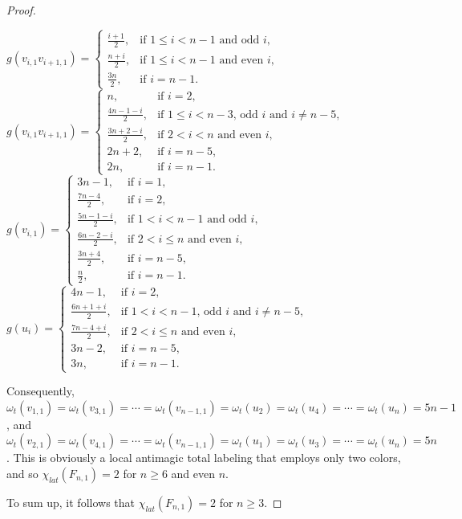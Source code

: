 \documentclass[12pt]{article}
\begin{document}
\begin{proof}
\begin{center}
$g(v_{i,1}v_{i+1,1})=\begin{cases}
\frac{i+1}{2}, & \text{if $1\leq i<n-1$ and odd $i$},\\[4pt]
 \frac{n+i}{2}, & \text{if $1\leq i<n-1$ and even $i$},\hspace{6em}\\[4pt]
\frac{3n}{2}, &\text{if $i=n-1$}. \end{cases}$\\[6pt]
$g(v_{i,1}v_{i+1,1})=\begin{cases}
n,    & \text{if } i=2,\\[8pt]
\frac{4n-1-i}{2}, & \text{if  $1\leq i<n-3$, odd $i$ and $i\neq n-5$},\\[4pt]
\frac{3n+2-i}{2}, & \text{if $2< i<n$ and even $i$},\\[4pt]
2n+2, & \text{if } i=n-5,\\[4pt]
2n, &\text{if $i=n-1$}. \end{cases}$\\[8pt]
$g(v_{i,1})=\begin{cases}
	3n-1, & \text{if } i=1,\\[4pt]
\frac{7n-4}{2}, & \text{if } i=2,\\[4pt]
	\frac{5n-1-i}{2}, & \text{if $1< i< n-1$ and odd $i$},\hspace{5em}\\[4pt]
	\frac{6n-2-i}{2}, & \text{if $2< i\leq n$ and even $i$},\\[4pt]
	\frac{3n+4}{2}, & \text{if } i=n-5,\\[4pt]
	\frac{n}{2}, &\text{if $i=n-1$}. \end{cases}$\\[8pt]
$g(u_{i})=\begin{cases}
		4n-1, & \text{if } i=2,\\[4pt]
		\frac{6n+1+i}{2}, & \text{if $1<i< n-1$, odd $i$ and $i\neq n-5$},\\[4pt]
		\frac{7n-4+i}{2}, & \text{if $2< i\leq n$ and even $i$},\\[4pt]
		3n-2, & \text{if } i=n-5,\\[4pt]
		3n, &\text{if $i=n-1$}. \end{cases}$
\end{center}
Consequently, $\omega_{t}(v_{1,1})=\omega_{t}(v_{3,1})=\cdots=\omega_{t}(v_{n-1,1})=\omega_{t}(u_{2})=\omega_{t}(u_{4})=\cdots=\omega_{t}(u_{n})=5n-1$, and
$\omega_{t}(v_{2,1})=\omega_{t}(v_{4,1})=\cdots=\omega_{t}(v_{n-1,1})=\omega_{t}(u_{1})=\omega_{t}(u_{3})=\cdots=\omega_{t}(u_{n})=5n$.  This is obviously a local antimagic total labeling that employs only two colors, and so $\chi_{lat}(F_{n,1})=2$ for $n\geq 6$ and even $n$.

To sum up, it follows that $\chi_{lat}(F_{n,1})=2$ for $n\geq 3$.\end{proof}
\end{document}
